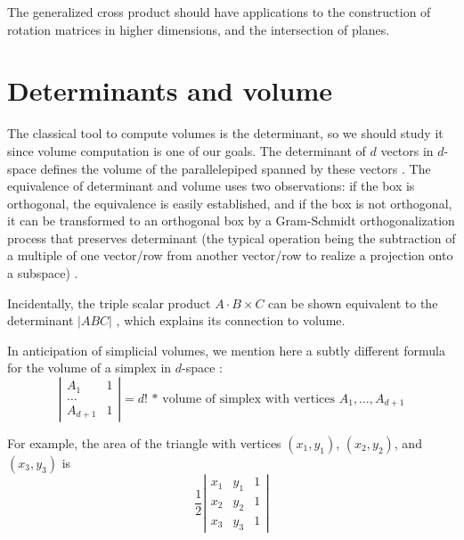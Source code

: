 \documentclass[10pt]{article}
\begin{document}
The generalized cross product should have applications to the construction of rotation
matrices in higher dimensions, and the intersection of planes.

\clearpage


\section{Determinants and volume}

The classical tool to compute volumes is the determinant,
so we should study it since volume computation is one of our goals.
The determinant of $d$ vectors in $d$-space defines the volume 
of the parallelepiped spanned by these vectors \cite{strang88}. %
The equivalence of determinant and volume uses two observations:
if the box is orthogonal, the equivalence is easily established, and 
if the box is not orthogonal, it can be transformed to an orthogonal box by a
Gram-Schmidt orthogonalization process that preserves determinant
(the typical operation being the subtraction of a multiple of one vector/row from
another vector/row to realize a projection onto a subspace) \cite{strang88}.

Incidentally, the triple scalar product $A \cdot B \times C$ 
can be shown equivalent to the determinant $|A B C|$ \cite{wrede72}, %
which explains its connection to volume.

In anticipation of simplicial volumes, we mention here a subtly different formula
for the volume of a simplex in $d$-space \cite[p. 27]{orourke94}:
\[
\left|
\begin{array}{cc}
A_1 & 1 \\
\ldots \\
A_{d+1} & 1 
\end{array}
\right|
    = d! \mbox{ * volume of simplex with vertices $A_1,\ldots,A_{d+1}$} 
\]

For example, the area of the triangle with vertices $(x_1,y_1)$, $(x_2,y_2)$, and
$(x_3,y_3)$ is 
\[
\frac{1}{2}
\left|
\begin{array}{ccc}
x_1 & y_1 & 1 \\
x_2 & y_2 & 1 \\
x_3 & y_3 & 1 
\end{array}
\right|
\]
\end{document}
